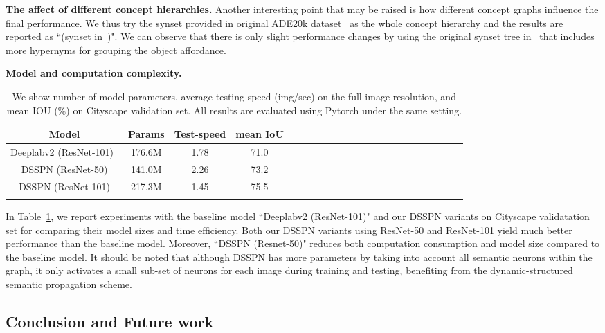 \documentclass[10pt,twocolumn,letterpaper]{article}
\begin{document}
\textbf{The affect of different concept hierarchies.} Another interesting point that may be raised is how different concept graphs influence the final performance. We thus try the synset provided in original ADE20k dataset~\cite{zhou2016semantic} as the whole concept hierarchy and the results are reported as ``(synset in~\cite{zhou2016semantic})". We can observe that there is only slight performance changes by using the original synset tree in~\cite{zhou2016semantic} that includes more hypernyms for grouping the object affordance. 

\textbf{Model and computation complexity.}
\begin{table}[!tp]\setlength{\tabcolsep}{2pt}
	\centering\footnotesize{\caption{We show number of model parameters, average testing speed (img/sec) on the full image resolution, and mean IOU (\%) on Cityscape validation set. All results are evaluated using Pytorch under the same setting. }\label{tab:complex}
	\begin{tabular}{cccccccccccccccccccccc}
		\toprule
		{Model} & Params & Test-speed & mean IoU\\
		\midrule
		Deeplabv2 (ResNet-101)~\cite{chen2016deeplab} & 176.6M & 1.78 &71.0\\
		DSSPN (ResNet-50) & 141.0M & 2.26 & 73.2\\
		DSSPN (ResNet-101) & 217.3M & 1.45 & {75.5}\\
		\hline
				\vspace{-7mm}
	\end{tabular}}
\end{table}

	
In Table~\ref{tab:complex}, we report experiments with the baseline model ``Deeplabv2 (ResNet-101)" and our DSSPN variants on Cityscape validatation set for comparing their model sizes and time efficiency. Both our DSSPN variants using ResNet-50 and ResNet-101 yield much better performance than the baseline model. Moreover, ``DSSPN (Resnet-50)" reduces both computation consumption and model size compared to the baseline model. It should be noted that although DSSPN has more parameters by taking into account all semantic neurons within the graph, it only activates a small sub-set of neurons for each image during training and testing, benefiting from the dynamic-structured semantic propagation scheme.

\subsection{Conclusion and Future work}
\end{document}
